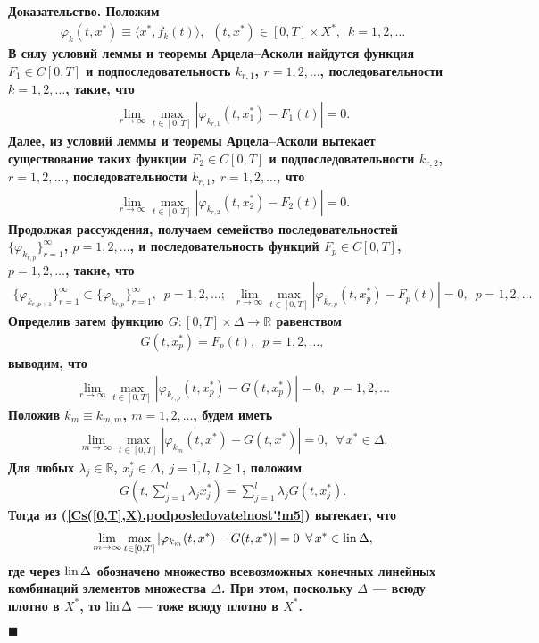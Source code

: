 \documentclass{report}
\newenvironment{Proof}{\par\noindent\bf Доказательство.\rm}{ $\blacksquare$\par}
\newcommand{\lin}{\mathop{\rm lin}\nolimits}
\begin{document}
\begin{Proof}
Положим
\begin{gather*}
\varphi_k(t,x^*)\equiv\langle x^*,f_k(t)\rangle,\,\,\,(t,x^*)\in[0,T]\times X^*,\,\,\,k=1,2,\dots
\end{gather*}
В силу условий леммы и теоремы Арцела--Асколи \cite[стр.125]{iosida} найдутся функция $F_1\in C[0,T]$ и подпоследовательность $k_{r,1}$, $r=1,2,\dots$, последовательности $k=1,2,\dots$,
такие, что
\begin{gather*}
\lim\limits_{r\to\infty}\max\limits_{t\in[0,T]}|\varphi_{k_{r,1}}(t,x^*_1)-F_1(t)|=0.
\end{gather*}
Далее, из условий леммы и теоремы Арцела--Асколи вытекает существование таких функции $F_2\in C[0,T]$ и подпоследовательности $k_{r,2}$, $r=1,2,\dots$, последовательности $k_{r,1}$,
$r=1,2,\dots$, что
\begin{gather*}
\lim\limits_{r\to\infty}\max\limits_{t\in[0,T]}|\varphi_{k_{r,2}}(t,x^*_2)-F_2(t)|=0.
\end{gather*}
Продолжая рассуждения, получаем семейство последовательностей $\{\varphi_{k_{r,p}}\}_{r=1}^\infty$, $p=1,2,\dots$, и последовательность функций $F_p\in C[0,T]$, $p=1,2,\dots$, такие, что
\begin{gather*}
\{\varphi_{k_{r,p+1}}\}_{r=1}^\infty\subset\{\varphi_{k_{r,p}}\}_{r=1}^\infty,\,\,\,p=1,2,\dots;\,\,\,
\lim\limits_{r\to\infty}\max\limits_{t\in[0,T]}|\varphi_{k_{r,p}}(t,x^*_p)-F_p(t)|=0,\,\,\,p=1,2,\dots
\end{gather*}
Определив затем функцию $G:[0,T]\times\Delta\to\mathbb{R}$ равенством
\begin{gather*}
G(t,x^*_p)=F_p(t),\,\,\,p=1,2,\dots,
\end{gather*}
выводим, что
\begin{gather*}
\lim\limits_{r\to\infty}\max\limits_{t\in[0,T]}|\varphi_{k_{r,p}}(t,x^*_p)-G(t,x^*_p)|=0,\,\,\,p=1,2,\dots
\end{gather*}
Положив $k_m\equiv k_{m,m}$, $m=1,2,\dots$, будем иметь
\begin{gather}\label{Cs([0,T],X).podposledovatelnost'!m5}
\lim\limits_{m\to\infty}\max\limits_{t\in[0,T]}|\varphi_{k_m}(t,x^*)-G(t,x^*)|=0,\,\,\,\forall\,x^*\in\Delta.
\end{gather}
Для любых $\lambda_j\in\mathbb{R}$, $x^*_j\in\Delta$, $j=\overline{1,l}$, $l\geqslant1$, положим
\begin{gather*}
G\left(t,\sum\limits_{j=1}^l\lambda_jx^*_j\right)=\sum\limits_{j=1}^l\lambda_jG(t,x^*_j).
\end{gather*}
Тогда из (\ref{Cs([0,T],X).podposledovatelnost'!m5}) вытекает, что
\begin{gather}\label{Cs([0,T],X).podposledovatelnost'!m6}
\lim\limits_{m\to\infty}\max\limits_{t\in[0,T]}|\varphi_{k_m}(t,x^*)-G(t,x^*)|=0\,\,\,\forall\,x^*\in\lin\Delta,
\end{gather}
где через $\lin\Delta$ обозначено множество всевозможных конечных линейных комбинаций элементов множества $\Delta$. При этом, поскольку
$\Delta$ --- всюду плотно в $X^*$, то $\lin\Delta$ --- тоже всюду плотно в $X^*$.


\end{Proof}
\end{document}
